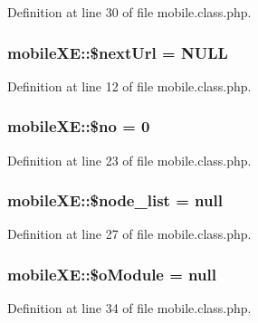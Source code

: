 Definition at line 30 of file mobile.\+class.\+php.

\hypertarget{classmobileXE_adbdb5909b975bb776f91817d2392aaca}{
\subsubsection[{\$next\+Url}]{\setlength{\rightskip}{0pt plus 5cm}mobile\+X\+E\+::\$next\+Url = N\+U\+L\+L}}\label{classmobileXE_adbdb5909b975bb776f91817d2392aaca}


Definition at line 12 of file mobile.\+class.\+php.

\hypertarget{classmobileXE_a497e828014cdb6eaef56dd42d0f816e6}{
\subsubsection[{\$no}]{\setlength{\rightskip}{0pt plus 5cm}mobile\+X\+E\+::\$no = 0}}\label{classmobileXE_a497e828014cdb6eaef56dd42d0f816e6}


Definition at line 23 of file mobile.\+class.\+php.

\hypertarget{classmobileXE_af906479c52f412d0beae2252bad4ef35}{
\subsubsection[{\$node\+\_\+list}]{\setlength{\rightskip}{0pt plus 5cm}mobile\+X\+E\+::\$node\+\_\+list = null}}\label{classmobileXE_af906479c52f412d0beae2252bad4ef35}


Definition at line 27 of file mobile.\+class.\+php.

\hypertarget{classmobileXE_a64908b5e1d46537b4739036b1a00b689}{
\subsubsection[{\$o\+Module}]{\setlength{\rightskip}{0pt plus 5cm}mobile\+X\+E\+::\$o\+Module = null}}\label{classmobileXE_a64908b5e1d46537b4739036b1a00b689}


Definition at line 34 of file mobile.\+class.\+php.

